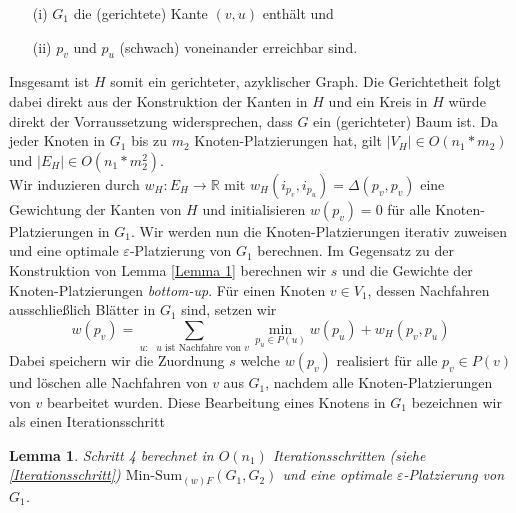 \documentclass[a4paper, 12pt, twoside]{article}
\theoremstyle{Format1} %
\newtheorem{Lem}[Def]{Lemma}                %
\begin{document}
\begin{enumerate}
	\item[(i)] $G_1$ die (gerichtete) Kante $(v,u)$ enthält und
	\item[(ii)] $p_v$ und $p_u$ (schwach) voneinander erreichbar sind.
\end{enumerate}

Insgesamt ist $H$ somit ein gerichteter, azyklischer Graph. Die Gerichtetheit folgt dabei direkt aus der Konstruktion der Kanten in $H$ und
ein Kreis in $H$ würde direkt der Vorraussetzung widersprechen, dass $G$ ein (gerichteter) Baum ist.
Da jeder Knoten in $G_1$ bis zu $m_2$ Knoten-Platzierungen hat, gilt $|V_H| \in O(n_1*m_2)$ und $|E_H| \in O(n_1*m_2^2)$.
\\
Wir induzieren durch $w_H: E_H \to \mathbb{R}$ mit $w_H(i_{p_v},i_{p_u}) = \Delta(p_v,p_v)$ eine Gewichtung der Kanten von $H$ und
initialisieren $w(p_v) = 0$ für alle Knoten-Platzierungen in $G_1$.
Wir werden nun die Knoten-Platzierungen iterativ zuweisen und eine optimale $\varepsilon$-Platzierung von $G_1$ berechnen.
Im Gegensatz zu der Konstruktion von Lemma \ref{Lemma 1} berechnen wir $s$ und die Gewichte der Knoten-Platzierungen \textit{bottom-up}.
Für einen Knoten $v \in V_1$, dessen Nachfahren ausschließlich Blätter in $G_1$ sind, setzen wir
\begin{equation}
	w(p_v) = \sum_{\text{$u:$ $u$ ist Nachfahre von $v$}} \min_{p_u \in P(u)} w(p_u) + w_H(p_v,p_u) \label{optimal placements}
\end{equation}
Dabei speichern wir die Zuordnung $s$ welche $w(p_v)$ realisiert für alle $p_v \in P(v)$ und löschen alle Nachfahren von $v$ aus $G_1$,
nachdem alle Knoten-Platzierungen von $v$ bearbeitet wurden.
Diese Bearbeitung eines Knotens in $G_1$ bezeichnen wir als einen Iterationsschritt \label{Iterationsschritt}

\begin{Lem} \label{Lemma 2}
	Schritt 4 berechnet in $O(n_1)$ Iterationsschritten (siehe \ref{Iterationsschritt}) $\text{Min-Sum}_{(w)F}(G_1,G_2)$ und
	eine optimale $\varepsilon$-Platzierung von $G_1$.
\end{Lem}
\end{document}
